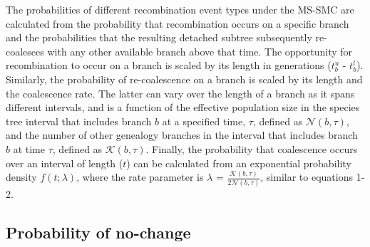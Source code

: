 \documentclass[11pt]{article}
\begin{document}



The probabilities of different recombination event types under the 
MS-SMC are calculated from the probability that recombination occurs on 
a specific branch and the probabilities that the resulting detached 
subtree subsequently re-coalesces with any other available branch above that time. 
The opportunity for recombination to occur on a branch is scaled by 
its length in generations ($t_b^u$ - $t_b^l$). Similarly, the 
probability of re-coalescence on a branch is scaled by its length
and the coalescence rate. The latter can vary over the length of a branch
as it spans different intervals, and is a function of the effective 
population size in the species tree interval that includes branch $b$ at
a specified time, $\tau$, defined as $\mathcal{N}(b,\tau)$, and the number of 
other genealogy branches in the interval that includes branch $b$ at time $\tau$,
defined as $\mathcal{K}(b,\tau)$.
Finally, the probability that coalescence occurs over an interval of length ($t$) 
can be calculated from an exponential probability density $f(t; \lambda)$, 
where the rate parameter is $\lambda$ = $\frac{\mathcal{K}(b,\tau)}{2\mathcal{N}(b,\tau)}$, 
similar to equations 1-2. 

\subsection{Probability of no-change}
\end{document}
